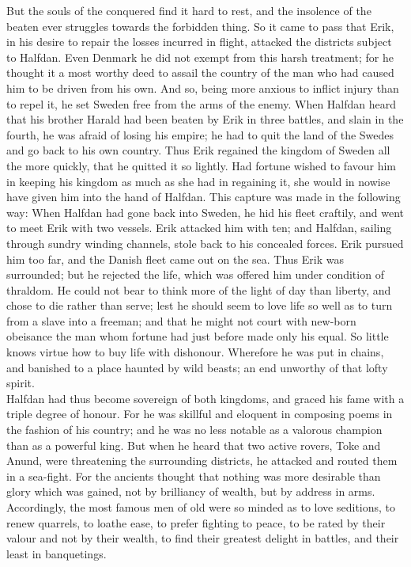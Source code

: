 \documentclass[10pt,a4paper]{report}
\begin{document}
But the souls of the conquered find it hard to rest, and the insolence of the beaten ever struggles towards the forbidden thing. So it came to pass that Erik, in his desire to repair the losses incurred in flight, attacked the districts subject to Halfdan. Even Denmark he did not exempt from this harsh treatment; for he thought it a most worthy deed to assail the country of the man who had caused him to be driven from his own. And so, being more anxious to inflict injury than to repel it, he set Sweden free from the arms of the enemy. When Halfdan heard that his brother Harald had been beaten by Erik in three battles, and slain in the fourth, he was afraid of losing his empire; he had to quit the land of the Swedes and go back to his own country. Thus Erik regained the kingdom of Sweden all the more quickly, that he quitted it so lightly. Had fortune wished to favour him in keeping his kingdom as much as she had in regaining it, she would in nowise have given him into the hand of Halfdan. This capture was made in the following way: When Halfdan had gone back into Sweden, he hid his fleet craftily, and went to meet Erik with two vessels. Erik attacked him with ten; and Halfdan, sailing through sundry winding channels, stole back to his concealed forces. Erik pursued him too far, and the Danish fleet came out on the sea. Thus Erik was surrounded; but he rejected the life, which was offered him under condition of thraldom. He could not bear to think more of the light of day than liberty, and chose to die rather than serve; lest he should seem to love life so well as to turn from a slave into a freeman; and that he might not court with new-born obeisance the man whom fortune had just before made only his equal. So little knows virtue how to buy life with dishonour. Wherefore he was put in chains, and banished to a place haunted by wild beasts; an end unworthy of that lofty spirit.\\

Halfdan had thus become sovereign of both kingdoms, and graced his fame with a triple degree of honour. For he was skillful and eloquent in composing poems in the fashion of his country; and he was no less notable as a valorous champion than as a powerful king. But when he heard that two active rovers, Toke and Anund, were threatening the surrounding districts, he attacked and routed them in a sea-fight. For the ancients thought that nothing was more desirable than glory which was gained, not by brilliancy of wealth, but by address in arms. Accordingly, the most famous men of old were so minded as to love seditions, to renew quarrels, to loathe ease, to prefer fighting to peace, to be rated by their valour and not by their wealth, to find their greatest delight in battles, and their least in banquetings.\\
\end{document}
